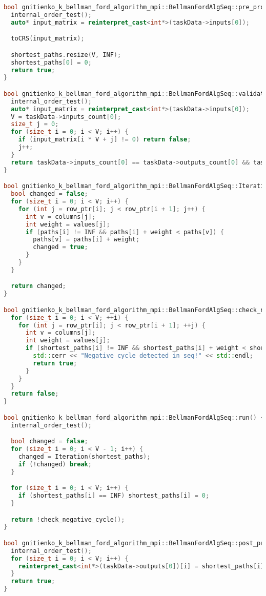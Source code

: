 \documentclass[12pt]{article}
\begin{document}
\begin{lstlisting}[language=C++, caption={Код алгоритма Беллмана-Форда}]
bool gnitienko_k_bellman_ford_algorithm_mpi::BellmanFordAlgSeq::pre_processing() {
  internal_order_test();
  auto* input_matrix = reinterpret_cast<int*>(taskData->inputs[0]);

  toCRS(input_matrix);

  shortest_paths.resize(V, INF);
  shortest_paths[0] = 0;
  return true;
}

bool gnitienko_k_bellman_ford_algorithm_mpi::BellmanFordAlgSeq::validation() {
  internal_order_test();
  auto* input_matrix = reinterpret_cast<int*>(taskData->inputs[0]);
  V = taskData->inputs_count[0];
  size_t j = 0;
  for (size_t i = 0; i < V; i++) {
    if (input_matrix[i * V + j] != 0) return false;
    j++;
  }
  return taskData->inputs_count[0] == taskData->outputs_count[0] && taskData->inputs_count[0] != 0;
}

bool gnitienko_k_bellman_ford_algorithm_mpi::BellmanFordAlgSeq::Iteration(std::vector<int>& paths) {
  bool changed = false;
  for (size_t i = 0; i < V; i++) {
    for (int j = row_ptr[i]; j < row_ptr[i + 1]; j++) {
      int v = columns[j];
      int weight = values[j];
      if (paths[i] != INF && paths[i] + weight < paths[v]) {
        paths[v] = paths[i] + weight;
        changed = true;
      }
    }
  }

  return changed;
}

bool gnitienko_k_bellman_ford_algorithm_mpi::BellmanFordAlgSeq::check_negative_cycle() {
  for (size_t i = 0; i < V; ++i) {
    for (int j = row_ptr[i]; j < row_ptr[i + 1]; ++j) {
      int v = columns[j];
      int weight = values[j];
      if (shortest_paths[i] != INF && shortest_paths[i] + weight < shortest_paths[v]) {
        std::cerr << "Negative cycle detected in seq!" << std::endl;
        return true;
      }
    }
  }
  return false;
}

bool gnitienko_k_bellman_ford_algorithm_mpi::BellmanFordAlgSeq::run() {
  internal_order_test();

  bool changed = false;
  for (size_t i = 0; i < V - 1; i++) {
    changed = Iteration(shortest_paths);
    if (!changed) break;
  }

  for (size_t i = 0; i < V; i++) {
    if (shortest_paths[i] == INF) shortest_paths[i] = 0;
  }

  return !check_negative_cycle();
}

bool gnitienko_k_bellman_ford_algorithm_mpi::BellmanFordAlgSeq::post_processing() {
  internal_order_test();
  for (size_t i = 0; i < V; i++) {
    reinterpret_cast<int*>(taskData->outputs[0])[i] = shortest_paths[i];
  }
  return true;
}


\end{lstlisting}
\end{document}
